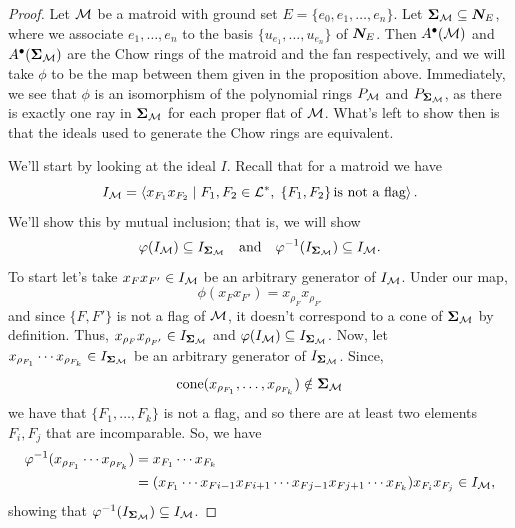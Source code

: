 \documentclass[12pt,oneside]{../../sfsuthesis}
\begin{document}
\begin{proof}
    Let \( \mathcal{M} \) be a matroid with ground set \( E = \{ e_0, e_1, \dots, e_n \} \).
    Let \( {\bm{\Sigma}}_{\mathcal{M}} \subseteq \bm{N}_E \), where we associate \( e_1, \dots, e_n \) to the basis \( \{ u_{e_1}, \dots, u_{e_n} \} \) of \( \bm{N}_E \).
    Then \( A^\bullet(\mathcal{M}) \) and \( A^\bullet({\bm{\Sigma}}_{\mathcal{M}}) \) are the Chow rings of the matroid and the fan respectively, and we will take \( \phi \) to be the map between them given in the proposition above.
    Immediately, we see that \( \phi \) is an isomorphism of the polynomial rings \( P_{\mathcal{M}} \) and \( P_{{\bm{\Sigma}}_{\mathcal{M}}} \), as there is exactly one ray in \( {\bm{\Sigma}}_{\mathcal{M}} \) for each proper flat of \( \mathcal{M} \).
    What's left to show then is that the ideals used to generate the Chow rings are equivalent.

    We'll start by looking at the ideal \( I \).
    Recall that for a matroid we have
    \[
        I_{\mathcal{M}} = \left\langle x_{F_1}x_{F_2} \; \middle| \; F_1, F_2 \in \mathcal{L}^\ast, \; \{F_1, F_2\} \, \text{is not a flag} \right\rangle.
    \]
    We'll show this by mutual inclusion; that is, we will show
    \[
        \varphi(I_{\mathcal{M}}) \subseteq I_{{\bm{\Sigma}}_{\mathcal{M}}} \quad \text{and} \quad \varphi^{-1}(I_{{\bm{\Sigma}}_{\mathcal{M}}}) \subseteq I_{\mathcal{M}}.
    \]
    To start let's take \( x_{F}x_{F'} \in I_{\mathcal{M}} \) be an arbitrary generator of \( I_{\mathcal{M}} \).
    Under our map,
    \[ \phi(x_{F}x_{F'}) = x_{\rho_F}x_{\rho_{F'}} \]
    and since \( \{F, F'\} \) is not a flag of \( \mathcal{M} \), it doesn't correspond to a cone of \( {\bm{\Sigma}}_{\mathcal{M}} \) by definition.
    Thus, \(  x_{\rho_F}x_{\rho_{F'}} \in I_{{\bm{\Sigma}}_{\mathcal{M}}} \) and \( \varphi(I_{\mathcal{M}}) \subseteq I_{{\bm{\Sigma}}_{\mathcal{M}}} \).
    Now, let \( x_{\rho_{F_1}} \cdots x_{\rho_{F_k}} \in I_{{\bm{\Sigma}}_{\mathcal{M}}} \) be an arbitrary generator of \( I_{{\bm{\Sigma}}_{\mathcal{M}}} \).
    Since,
    \[
        \mathrm{cone}(x_{\rho_{F_1}}, \dots, x_{\rho_{F_k}}) \notin {\bm{\Sigma}}_{\mathcal{M}}
    \]
    we have that \( \{ F_1, \dots, F_k \} \) is not a flag, and so there are at least two elements \( F_i, F_j \) that are incomparable.
    So, we have
    \begin{align*}
        \varphi^{-1}(x_{\rho_{F_1}} \cdots x_{\rho_{F_k}}) & = x_{F_1} \cdots x_{F_k}                                                                                       \\
                                                        & = (x_{F_1} \cdots x_{F{i-1}} x_{F{i+1}} \cdots x_{F{j-1}} x_{F{j+1}} \cdots x_{F_k}) x_{F_i}x_{F_j} \in I_{\mathcal{M}},
    \end{align*}
    showing that \( \varphi^{-1}(I_{{\bm{\Sigma}}_{\mathcal{M}}}) \subseteq  I_{\mathcal{M}} \).


\end{proof}
\end{document}
